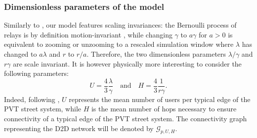 \documentclass[conference]{IEEEtran}
\begin{document}
\subsubsection{Dimensionless parameters of the model}
Similarly to \cite{cali2018percolation}, our model features scaling invariances: the Bernoulli process of relays is by definition motion-invariant \cite{chiu_stochastic_2013}, while changing $\gamma$ to $a\gamma$ for $a>0$ is equivalent to zooming or unzooming to a rescaled simulation window where $\lambda$ has changed to $a\lambda$ and $r$ to $r/a$. Therefore, the two dimensionless parameters $\lambda / \gamma$ and $r\gamma$ are scale invariant. It is however physically more interesting to consider the following parameters:
\begin{equation}
\label{dimensionless-parameters}
U = \frac{4}{3}\frac{\lambda}{\gamma} \quad \text{and} \quad H=\frac{4}{3}\frac{1}{r\gamma}.    
\end{equation}
Indeed, following \cite[Section 9.4]{chiu_stochastic_2013}, $U$ represents the mean number of users per typical edge of the PVT street system, while $H$ is the mean number of hops necessary to ensure connectivity of a typical edge of the PVT street system. 
The connectivity graph representing the D2D network will be denoted by $\mathcal{G}_{p,U,H}$.  
\end{document}
